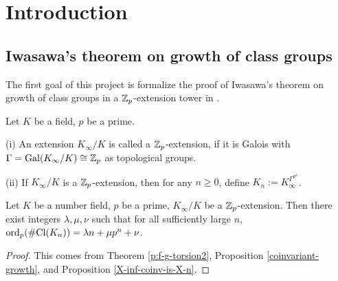 %

\tableofcontents

\section{Introduction}

\subsection{Iwasawa's theorem on growth of class groups}

The first goal of this project is formalize the proof of
Iwasawa's theorem on growth of class groups in a ${\mathbb {Z}}_p$-extension tower
in {\Lean}.

\begin{definition}
\label{Zp-ext-def}
\leanok
Let $K$ be a field, $p$ be a prime.

{\rm(i)} An extension $K_\infty/K$ is called a ${\mathbb {Z}}_p$-extension,
if it is Galois with $\Gamma={\mathrm{Gal}}(K_\infty/K)\cong{\mathbb {Z}}_p$
as topological groups.

{\rm(ii)} If $K_\infty/K$ is a ${\mathbb {Z}}_p$-extension, then for any
$n\geq 0$, define $K_n:=K_\infty^{\Gamma^{p^n}}$.
\end{definition}

\begin{thm}
\label{clgp-growth}
\leanok
Let $K$ be a number field, $p$ be a prime,
$K_\infty/K$ be a ${\mathbb {Z}}_p$-extension.
Then there exist integers $\lambda,\mu,\nu$
such that for all sufficiently large $n$,
$\operatorname{ord}_p(\#{\mathrm{Cl}}(K_n))=\lambda n+\mu p^n+\nu$.
\end{thm}

\begin{proof}
This comes from Theorem \ref{p:f-g-torsion2},
Proposition \ref{coinvariant-growth},
and Proposition \ref{X-inf-coinv-is-X-n}.
\end{proof}

